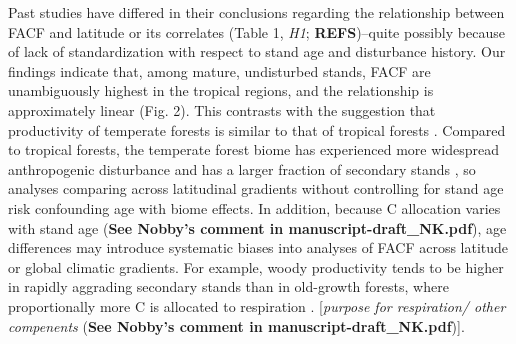 \documentclass[]{article}
\begin{document}
Past studies have differed in their conclusions regarding the
relationship between FACF and latitude or its correlates (Table 1,
\emph{H1}; \textbf{REFS})--quite possibly because of lack of
standardization with respect to stand age and disturbance history. Our
findings indicate that, among mature, undisturbed stands, FACF are
unambiguously highest in the tropical regions, and the relationship is
approximately linear (Fig. 2). This contrasts with the suggestion that
productivity of temperate forests is similar to that of tropical forests
\citep{huston_global_2009}. Compared to tropical forests, the temperate
forest biome has experienced more widespread anthropogenic disturbance
and has a larger fraction of secondary stands
\citep{potapov_mapping_2008, poulter_global_2018}, so analyses comparing
across latitudinal gradients without controlling for stand age risk
confounding age with biome effects. In addition, because C allocation
varies with stand age \citep{delucia_forest_2007} (\textbf{See Nobby's
comment in manuscript-draft\_NK.pdf}), age differences may introduce
systematic biases into analyses of FACF across latitude or global
climatic gradients. For example, woody productivity tends to be higher
in rapidly aggrading secondary stands than in old-growth forests, where
proportionally more C is allocated to respiration
\citep{kunert_understanding_2019}. {[}\emph{purpose for respiration/
other compenents} (\textbf{See Nobby's comment in
manuscript-draft\_NK.pdf}){]}.
\end{document}
